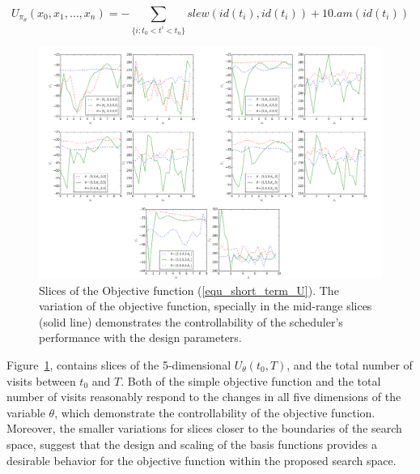 \documentclass[12pt]{aastex62}
\theoremstyle{definition}
\begin{document}
\begin{equation}\label{equ_short_term_U}
U_{\pi_{\theta}}(x_0,x_{1}, \dots, x_{n})= -\sum_{\{i:t_0<t^i<t_n\}} {slew(id(t_{i}), id(t_i)) + 10 . am(id(t_i))}
\end{equation}

\begin{figure}[h!]
\begin{center}
\includegraphics[width=1\linewidth]{Figures/Controlability.png}
\end{center}
\caption{Slices of the Objective function (\ref{equ_short_term_U}). The variation of the objective function, specially in the mid-range slices (solid line) demonstrates the controllability of the scheduler's performance with the design parameters.}
\label{fig_controlability}
\end{figure}

Figure~\ref{fig_controlability}, contains slices of the 5-dimensional $U_{\theta }(t_0, T)$, and the total number of visits between $t_0$ and $T$. Both of the simple objective function and the total number of visits reasonably respond to the changes in all five dimensions of the variable $\theta$, which demonstrate the controllability of the objective function. Moreover, the smaller variations for slices closer to the boundaries of the search space, suggest that the design and scaling of the basis functions provides a desirable behavior for the objective function within the proposed search space.
\end{document}
